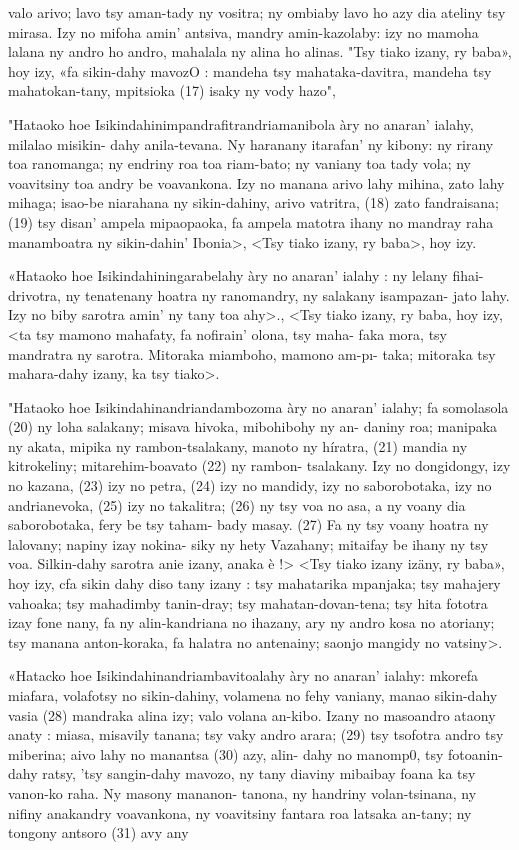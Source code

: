 valo arivo; lavo tsy aman-tady ny vositra; ny ombiaby lavo ho azy dia
ateliny tsy mirasa. Izy no mifoha amin' antsiva, mandry amin-kazolaby:
izy no mamoha lalana ny andro ho andro, mahalala ny alina ho alinas.
"Tsy tiako izany, ry baba», hoy izy, «fa sikin-dahy mavozO : mandeha tsy
mahataka-davitra, mandeha tsy mahatokan-tany, mpitsioka (17) isaky ny
vody hazo",

"Hataoko hoe Isikindahinimpandrafitrandriamanibola àry no anaran'
ialahy, milalao misikin- dahy anila-tevana. Ny haranany itarafan' ny kibony:
ny rirany toa ranomanga; ny endriny roa toa riam-bato; ny vaniany toa tady
vola; ny voavitsiny toa andry be voavankona. Izy no manana arivo lahy
mihina, zato lahy mihaga; isao-be niarahana ny sikin-dahiny, arivo vatritra,
(18) zato fandraisana; (19) tsy disan' ampela mipaopaoka, fa ampela
matotra ihany no mandray raha manamboatra ny sikin-dahin' Ibonia>, <Tsy
tiako izany, ry baba>, hoy izy.

«Hataoko hoe Isikindahiningarabelahy àry no anaran' ialahy : ny lelany
fihai-drivotra, ny tenatenany hoatra ny ranomandry, ny salakany isampazan-
jato lahy. Izy no biby sarotra amin' ny tany toa ahy>., <Tsy tiako izany,
ry baba, hoy izy, <ta tsy mamono mahafaty, fa nofirain' olona, tsy maha-
faka mora, tsy mandratra ny sarotra. Mitoraka miamboho, mamono am-pı-
taka; mitoraka tsy mahara-dahy izany, ka tsy tiako>.

"Hataoko hoe Isikindahinandriandambozoma àry no anaran' ialahy;
fa somolasola (20) ny loha salakany; misava hivoka, mibohibohy ny an-
daniny roa; manipaka ny akata, mipika ny rambon-tsalakany, manoto ny
híratra, (21) mandia ny kitrokeliny; mitarehim-boavato (22) ny rambon-
tsalakany. Izy no dongidongy, izy no kazana, (23) izy no petra, (24) izy no
mandidy, izy no saborobotaka, izy no andrianevoka, (25) izy no takalitra;
(26) ny tsy voa no asa, a ny voany dia saborobotaka, fery be tsy taham-
bady masay. (27) Fa ny tsy voany hoatra ny lalovany; napiny izay nokina-
siky ny hety Vazahany; mitaifay be ihany ny tsy voa. Silkin-dahy sarotra
anie izany, anaka è !> <Tsy tiako izany izäny, ry baba», hoy izy, cfa sikin
dahy diso tany izany : tsy mahatarika mpanjaka; tsy mahajery vahoaka; tsy
mahadimby tanin-dray; tsy mahatan-dovan-tena; tsy hita fototra izay fone
nany, fa ny alin-kandriana no ihazany, ary ny andro kosa no atoriany; tsy
manana anton-koraka, fa halatra no antenainy; saonjo mangidy no vatsiny>.

«Hatacko hoe Isikindahinandriambavitoalahy àry no anaran' ialahy:
mkorefa miafara, volafotsy no sikin-dahiny, volamena no fehy vaniany,
manao sikin-dahy vasia (28) mandraka alina izy; valo volana an-kibo. Izany
no masoandro ataony anaty : miasa, misavily tanana; tsy vaky andro arara;
(29) tsy tsofotra andro tsy miberina; aivo lahy no manantsa (30) azy, alin-
dahy no manomp0, tsy fotoanin-dahy ratsy, 'tsy sangin-dahy mavozo, ny
tany diaviny mibaibay foana ka tsy vanon-ko raha. Ny masony mananon-
tanona, ny handriny volan-tsinana, ny nifiny anakandry voavankona, ny
voavitsiny fantara roa latsaka an-tany; ny tongony antsoro (31) avy any

